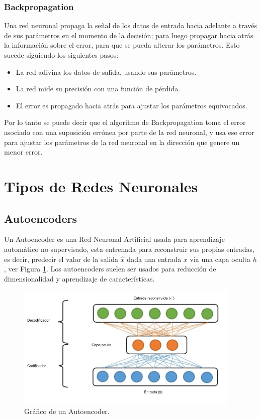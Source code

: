 \subsubsection{Backpropagation}

Una red neuronal propaga la se\~{n}al de los datos de entrada hacia adelante a trav\'{e}s de sus par\'{a}metros en el momento de la decisi\'{o}n; para luego propagar hacia atr\'{a}s la informaci\'{o}n sobre el error, para que se pueda alterar los par\'{a}metros. Esto sucede siguiendo los siguientes pasos:

\begin{itemize}
\item La red adivina los datos de salida, usando sus par\'{a}metros.
\item La red mide su precisi\'{o}n con una funci\'{o}n de p\'{e}rdida.
\item El error es propagado hacia atr\'{a}s para ajustar los par\'{a}metros equivocados.
\end{itemize}

Por lo tanto se puede decir que el algoritmo de Backpropagation toma el error asociado con una suposición errónea por parte de la red neuronal, y usa ese error para ajustar los parámetros de la red neuronal en la dirección que genere un menor error.

\section{Tipos de Redes Neuronales}

\subsection{Autoencoders}

Un Autoencoder es una Red Neuronal Artificial usada para aprendizaje autom\'{a}tico no supervisado, esta entrenada para reconstruir sus propias entradas, es decir, predecir el valor de la salida $\hat{x}$ dada una entrada $x$ via una capa oculta $h$, ver Figura \ref{fig:autoencoder}. Los autoencoders suelen ser usados para reducci\'{o}n de dimensionalidad y aprendizaje de caracter\'{i}sticas. 

\begin{figure}[h!]
  \begin{center}	\includegraphics[width=0.95\textwidth]{imagenes/Cap4/autoencoder}
  \caption{Gr\'{a}fico de un Autoencoder.}
  \label{fig:autoencoder}
  \end{center}
\end{figure}

